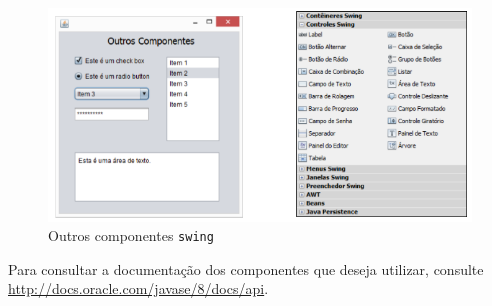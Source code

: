 \begin{figure}[h]
	\centering
	\includegraphics[width=0.4\textheight]{img/gui-outros-componentes}
	\caption{Outros componentes \texttt{swing}}
	\label{fig:gui-outros-componentes}
\end{figure}

Para consultar a documentação dos componentes que deseja utilizar, consulte \url{http://docs.oracle.com/javase/8/docs/api}.